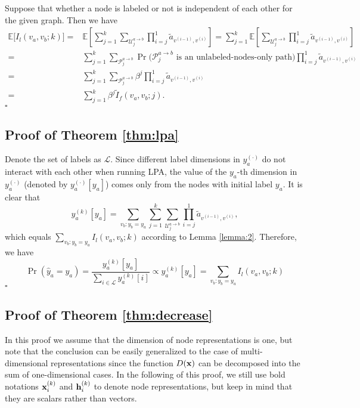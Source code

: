 \documentclass{article}
\newenvironment{proof}{{\noindent\it Proof.}\quad}{\hfill $\square$\par}
\begin{document}
		\begin{proof}
			Suppose that whether a node is labeled or not is independent of each other for the given graph.
			Then we have
			\begin{equation}
			\begin{split}
				\mathbb E \big[ I_l(v_a, v_b; k) \big] = & \mathbb E \left[ \sum_{j=1}^{k} \sum_{\mathcal U_j^{a \rightarrow b}} \prod_{i=j}^1 \tilde a_{v^{(i-1)}, v^{(i)}} \right] = \sum_{j=1}^{k} \mathbb E \left[ \sum_{\mathcal U_j^{a \rightarrow b}} \prod_{i=j}^1 \tilde a_{v^{(i-1)}, v^{(i)}} \right]\\
				= & \sum_{j=1}^k \sum_{\mathcal P_j^{a \rightarrow b}} \Pr \big( \mathcal P_j^{a \rightarrow b} \text{ is an unlabeled-nodes-only path} \big) \prod_{i=j}^1 \tilde a_{v^{(i-1)}, v^{(i)}}\\
				= & \sum_{j=1}^k \sum_{\mathcal P_j^{a \rightarrow b}} \beta^j \prod_{i=j}^1 \tilde a_{v^{(i-1)}, v^{(i)}}\\
				= & \sum_{j=1}^k \beta^j \tilde I_f(v_a, v_b; j).
			\end{split}
			\end{equation}
		\end{proof}
	
	
	\subsection{Proof of Theorem \ref{thm:lpa}}
	\label{app:c}
		\begin{proof}
			Denote the set of labels as $\mathcal L$.
			Since different label dimensions in $y_a^{(\cdot)}$ do not interact with each other when running LPA, the value of the $y_a$-th dimension in $y_a^{(\cdot)}$ (denoted by $y_a^{(\cdot)}[y_a]$) comes only from the nodes with initial label $y_a$.
			It is clear that
			\begin{equation}
				y_a^{(k)}[y_a] = \sum_{v_b: y_b = y_a} \sum_{j=1}^k \sum_{\mathcal U_j^{a \rightarrow b}} \prod_{i=j}^1 \tilde a_{v^{(i-1)}, v^{(i)}},
			\end{equation}
			which equals $\sum_{v_b: y_b = y_a} I_l(v_a, v_b; k)$ according to Lemma \ref{lemma:2}.
			Therefore, we have
			\begin{equation}
				\Pr(\hat y_a = y_a) = \frac{y_a^{(k)}[y_a]}{\sum_{i \in \mathcal L} y_a^{(k)}[i]} \propto y_a^{(k)}[y_a] = \sum_{v_b: y_b = y_a} I_l(v_a, v_b; k)
			\end{equation}
		\end{proof}
	
	
	\subsection{Proof of Theorem \ref{thm:decrease}}
	\label{app:d}
		In this proof we assume that the dimension of node representations is one, but note that the conclusion can be easily generalized to the case of multi-dimensional representations since the function $D({\bf x})$ can be decomposed into the sum of one-dimensional cases.
		In the following of this proof, we still use bold notations ${\bf x}_i^{(k)}$ and ${\bf h}_i^{(k)}$ to denote node representations, but keep in mind that they are scalars rather than vectors.
		
\end{document}
